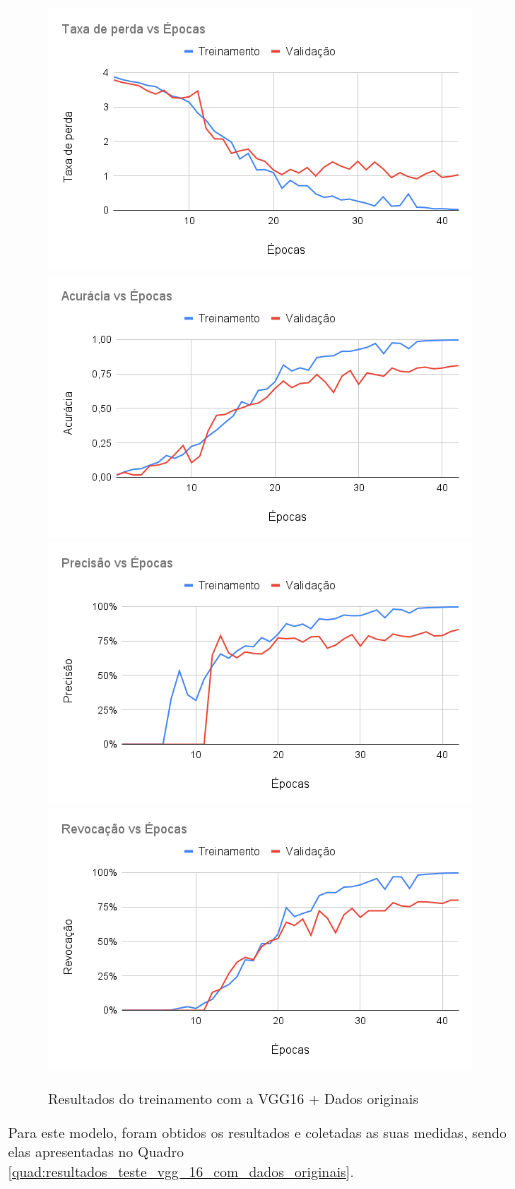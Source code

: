 \documentclass[
	12pt,				%
	oneside,			%
	a4paper,			%
	english,			%
	brazil				%
	]{abntex2ppgsi}
\begin{document}
\begin{figure}[H]
    \centering
    \caption{Resultados do treinamento com a VGG16 + Dados originais}
    \includegraphics[width=.50\textwidth]{imagens/resultados_discussao/architecture/vgg_16/original/perda.png}\hfill
    \includegraphics[width=.50\textwidth]{imagens/resultados_discussao/architecture/vgg_16/original/acuracia.png}\bigbreak    \includegraphics[width=.50\textwidth]{imagens/resultados_discussao/architecture/vgg_16/original/precisao.png}\hfill
    \includegraphics[width=.50\textwidth]{imagens/resultados_discussao/architecture/vgg_16/original/revocacao.png}
    \label{fig:vgg_16_dados_originais}
\end{figure}

Para este modelo, foram obtidos os resultados e coletadas as suas medidas, sendo elas apresentadas no Quadro \ref{quad:resultados_teste_vgg_16_com_dados_originais}.
\end{document}
